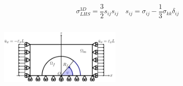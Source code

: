 \documentclass[first,firstsupp,lastsupp,last,hyperref,table]{ETHclass}
\begin{document}
\begin{frame}
\begin{columns}[c]
\begin{column}{0.5\textwidth}
\begin{figure}
\end{figure}
\scriptsize
\begin{equation*}
\sigma^{3D}_{LHS}=\frac{3}{2}s_{ij}s_{ij}\quad s_{ij}=\sigma_{ij}-\frac{1}{3}\sigma_{kk}\delta_{ij}
\end{equation*}
\end{column}
\end{columns}
\vspace{-0.3cm}
\includegraphics[width=0.45\textwidth]{refAngle.pdf}
\end{frame}

\addtocounter{framenumber}{-1}
\end{document}
